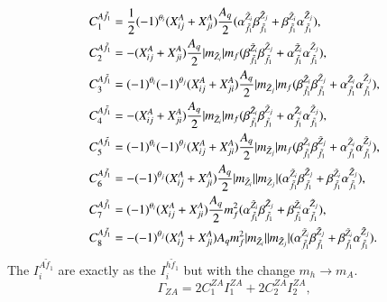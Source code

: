 \documentclass[final,3p,times]{elsarticle}
\begin{document}
\begin{align}
C_{1}^{A \tilde{f}_1} &= \frac{1}{2}(-1)^{\theta_i}(X_{ij}^A + X_{ji}^A) {A_q \over 2} ({\alpha_{\tilde{f}_1}^{\tilde{Z}_i}} {\beta_{\tilde{f}_1}^{\tilde{Z}_j}} + {\beta_{\tilde{f}_1}^{\tilde{Z}_i}}{\alpha_{\tilde{f}_1}^{\tilde{Z}_j}}), \\
C_{2}^{A \tilde{f}_1} &= -(X_{ij}^A + X_{ji}^A) {A_q \over 2} |m_{\tilde{Z}_i}|m_{f} ({\beta_{\tilde{f}_1}^{\tilde{Z}_i}} {\beta_{\tilde{f}_1}^{\tilde{Z}_j}} + {\alpha_{\tilde{f}_1}^{\tilde{Z}_i}}{\alpha_{\tilde{f}_1}^{\tilde{Z}_j}}), \\
C_{3}^{A \tilde{f}_1} &= (-1)^{\theta_i}(-1)^{\theta_j}(X_{ij}^A + X_{ji}^A) {A_q \over 2} |m_{\tilde{Z}_j}|m_{f} ({\beta_{\tilde{f}_1}^{\tilde{Z}_i}} {\beta_{\tilde{f}_1}^{\tilde{Z}_j}} + {\alpha_{\tilde{f}_1}^{\tilde{Z}_i}}{\alpha_{\tilde{f}_1}^{\tilde{Z}_j}}), \\
C_{4}^{A \tilde{f}_1} &= -(X_{ij}^A + X_{ji}^A) {A_q \over 2} |m_{\tilde{Z}_i}|m_{f} ({\beta_{\tilde{f}_1}^{\tilde{Z}_i}} {\beta_{\tilde{f}_1}^{\tilde{Z}_j}} + {\alpha_{\tilde{f}_1}^{\tilde{Z}_i}}{\alpha_{\tilde{f}_1}^{\tilde{Z}_j}}), \\
C_{5}^{A \tilde{f}_1} &= (-1)^{\theta_i}(-1)^{\theta_j}(X_{ij}^A + X_{ji}^A) {A_q \over 2} |m_{\tilde{Z}_j}|m_{f} ({\beta_{\tilde{f}_1}^{\tilde{Z}_i}} {\beta_{\tilde{f}_1}^{\tilde{Z}_j}} + {\alpha_{\tilde{f}_1}^{\tilde{Z}_i}}{\alpha_{\tilde{f}_1}^{\tilde{Z}_j}}), \\
C_{6}^{A \tilde{f}_1} &= -(-1)^{\theta_j}(X_{ij}^A + X_{ji}^A) {A_q \over 2} |m_{\tilde{Z}_i}||m_{\tilde{Z}_j}| ({\alpha_{\tilde{f}_1}^{\tilde{Z}_i}} {\beta_{\tilde{f}_1}^{\tilde{Z}_j}} + {\beta_{\tilde{f}_1}^{\tilde{Z}_i}}{\alpha_{\tilde{f}_1}^{\tilde{Z}_j}}), \\
C_{7}^{A \tilde{f}_1} &= (-1)^{\theta_i}(X_{ij}^A + X_{ji}^A) {A_q \over 2} m_{f}^2 ({\alpha_{\tilde{f}_1}^{\tilde{Z}_i}} {\beta_{\tilde{f}_1}^{\tilde{Z}_j}} + {\beta_{\tilde{f}_1}^{\tilde{Z}_i}}{\alpha_{\tilde{f}_1}^{\tilde{Z}_j}}), \\
C_{8}^{A \tilde{f}_1} &= -(-1)^{\theta_j}(X_{ij}^A + X_{ji}^A) {A_q} m_{f}^2 |m_{\tilde{Z}_i}||m_{\tilde{Z}_j}| ({\alpha_{\tilde{f}_1}^{\tilde{Z}_i}} {\beta_{\tilde{f}_1}^{\tilde{Z}_j}} + {\beta_{\tilde{f}_1}^{\tilde{Z}_i}}{\alpha_{\tilde{f}_1}^{\tilde{Z}_j}}).
\end{align}
The $I_{i}^{A \tilde{f}_1}$ are exactly as the $I_{i}^{h \tilde{f}_1}$ but with the change $m_{h} \rightarrow m_{A}$.
\begin{equation}
\Gamma_{Z A} = 2C_{1}^{Z A} I_{1}^{Z A} + 2C_{2}^{Z A} I_{2}^{Z A},
\end{equation}
\end{document}
